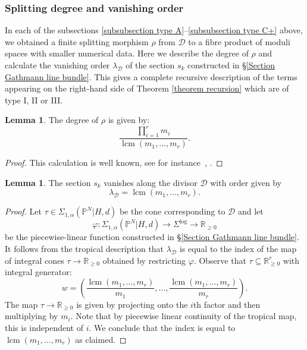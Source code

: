 \documentclass[11pt]{amsart}
\newcommand{\lcm}{\operatorname{lcm}}
\newcommand{\PP}{\mathbb P}
\renewcommand{\to}{\rightarrow}
\newcommand{\Dcal}{\mathcal{D}}
\newcommand{\RR}{\mathbb{R}}
\theoremstyle{definition}
\newtheorem{lemma}[thm]{Lemma}
\theoremstyle{definition}
\begin{document}
\subsubsection{Splitting degree and vanishing order} \label{subsubsection splitting degree} In each of the subsections \ref{subsubsection type A}--\ref{subsubsection type C+} above, we obtained a finite splitting morphism $\rho$ from $\Dcal$ to a fibre product of moduli spaces with smaller numerical data. Here we describe the degree of $\rho$ and calculate the vanishing order $\lambda_\Dcal$ of the section $s_k$ constructed in \S \ref{Section Gathmann line bundle}. This gives a complete recursive description of the terms appearing on the right-hand side of Theorem \ref{theorem recursion} which are of type I, II or III.

\begin{lemma}\label{lem:saturation} The degree of $\rho$ is given by:
\begin{equation*} \label{degree of gluing} \dfrac{\prod_{i=1}^r m_i}{\lcm(m_1,\ldots,m_r)}. \end{equation*}\end{lemma}
\begin{proof} This calculation is well known, see for instance~\cite[Section~7.9]{ChenDegeneration}, \cite[Section~5.3]{ACGSDecomposition}.
\end{proof}

\begin{lemma}\label{lemma vanishing order} The section $s_k$ vanishes along the divisor $\Dcal$ with order given by 
\[
\lambda_\Dcal = \lcm(m_1,\ldots,m_r).
\] 
\end{lemma}
\begin{proof} Let $\tau \in \Sigma_{1,\alpha}(\PP^N|H,d)$ be the cone corresponding to $\Dcal$ and let
\begin{equation*} \varphi \colon \Sigma_{1,\alpha}(\PP^N|H,d) \to \Sigma^{\log} \to \RR_{\geq 0} \end{equation*}
be the piecewise-linear function constructed in \S \ref{Section Gathmann line bundle}. It follows from the tropical description that $\lambda_\Dcal$ is equal to the index of the map of integral cones $\tau \to \RR_{\geq 0}$ obtained by restricting $\varphi$. Observe that $\tau \subseteq \RR_{\geq 0}^r$ with integral generator:
\begin{equation*} w = \left( \dfrac{\lcm(m_1,\ldots,m_r)}{m_1},\ldots,\dfrac{\lcm(m_1,\ldots,m_r)}{m_r} \right).\end{equation*}
The map $\tau \to \RR_{\geq 0}$ is given by projecting onto the $i$th factor and then multiplying by $m_i$. Note that by piecewise linear continuity of the tropical map, this is independent of $i$. We conclude that the index is equal to $\lcm(m_1,\ldots,m_r)$ as claimed.\end{proof}
\end{document}

